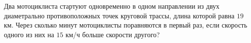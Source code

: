 \begin{ex}
	\begin{condition}
		Два мотоциклиста стартуют одновременно в одном направлении из двух диаметрально противоположных точек круговой трассы, длина которой равна \( 19  \) км. Через сколько минут мотоциклисты поравняются в первый раз, если скорость одного из них на \( 15  \) км/ч больше скорости другого?
	\end{condition}
\end{ex}